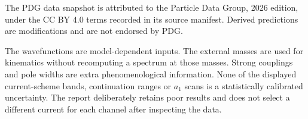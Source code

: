 \documentclass[11pt,a4paper]{article}
\newcommand{\tab}[2]{\begin{table}[htbp]\centering\small\caption{#2}\end{table}}
\begin{document}
\tab{references}{Imported 2026 PDG branching-fraction rows; the IDs link to PDG Live. Exact central values and errors are in the frozen input files.}

The PDG data snapshot is attributed to the Particle Data Group, 2026 edition, under the CC BY 4.0 terms recorded in its source manifest. Derived predictions are modifications and are not endorsed by PDG.

The wavefunctions are model-dependent inputs. The external masses are used for kinematics without recomputing a spectrum at those masses. Strong couplings and pole widths are extra phenomenological information. None of the displayed current-scheme bands, continuation ranges or $a_1$ scans is a statistically calibrated uncertainty. The report deliberately retains poor results and does not select a different current for each channel after inspecting the data.
\end{document}
